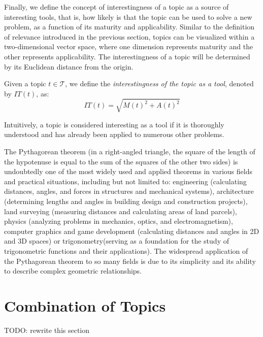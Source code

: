 Finally, we define the concept of interestingness of a topic as a source of interesting tools, that is, how likely is that the topic can be used to solve a new problem, as a function of its maturity and applicability. Similar to the definition of relevance introduced in the previous section, topics can be visualized within a two-dimensional vector space, where one dimension represents maturity and the other represents applicability. The interestingness of a topic will be determined by its Euclidean distance from the origin.

\begin{definition}
Given a topic $t \in \mathcal{T}$, we define the \emph{interestingness of the topic as a tool}, denoted by $IT(t)$, as:
\[
IT(t) = \sqrt{ M(t)^2 +  A(t)^2 }
\]
\end{definition}

Intuitively, a topic is considered interesting as a tool if it is thoroughly understood and has already been applied to numerous other problems.

\begin{example}
The Pythagorean theorem (in a right-angled triangle, the square of the length of the hypotenuse is equal to the sum of the squares of the other two sides) is undoubtedly one of the most widely used and applied theorems in various fields and practical situations, including but not limited to: engineering (calculating distances, angles, and forces in structures and mechanical systems), architecture (determining lengths and angles in building design and construction projects), land surveying (measuring distances and calculating areas of land parcels), physics (analyzing problems in mechanics, optics, and electromagnetism), computer graphics and game development (calculating distances and angles in 2D and 3D spaces) or trigonometry(serving as a foundation for the study of trigonometric functions and their applications). The widespread application of the Pythagorean theorem to so many fields is due to its simplicity and its ability to describe complex geometric relationships.
\end{example}

%
%

\section{Combination of Topics}

{\color{red} TODO: rewrite this section}

